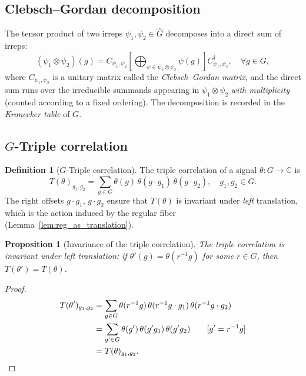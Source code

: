 \documentclass{article}
\newtheorem{proposition}[theorem]{Proposition}
\theoremstyle{definition}
\newtheorem{definition}[theorem]{Definition}
\theoremstyle{remark}
\newcommand{\C}{\mathbb{C}}
\newcommand{\Ghat}{\widehat{G}}
\begin{document}
\subsection{Clebsch--Gordan decomposition}\label{sec:cg}

The tensor product of two irreps $\psi_1, \psi_2 \in \Ghat$ decomposes into a direct sum of irreps:
\begin{equation}\label{eq:cg}
(\psi_1 \otimes \psi_2)(g) = C_{\psi_1,\psi_2} \left[\bigoplus_{\psi \in \psi_1 \otimes \psi_2} \psi(g)\right] C_{\psi_1,\psi_2}^\dagger, \quad \forall g \in G,
\end{equation}
where $C_{\psi_1,\psi_2}$ is a unitary matrix called the \textit{Clebsch--Gordan matrix}, and the direct sum runs over the irreducible summands appearing in $\psi_1 \otimes \psi_2$ \textit{with multiplicity} (counted according to a fixed ordering). The decomposition is recorded in the \textit{Kronecker table} of $G$.

\subsection{$G$-Triple correlation}\label{sec:tc_prelim}

\begin{definition}[$G$-Triple correlation]\label{def:tc}
The triple correlation of a signal $\theta : G \to \C$ is
\begin{equation}\label{eq:tc}
T(\theta)_{g_1, g_2} = \sum_{g \in G} \theta(g)\, \theta(g \cdot g_1)\, \theta(g \cdot g_2), \quad g_1, g_2 \in G.
\end{equation}
The right offsets $g \cdot g_1$, $g \cdot g_2$ ensure that $T(\theta)$ is invariant under \textit{left} translation, which is the action induced by the regular fiber (Lemma~\ref{lem:reg_as_translation}).
\end{definition}

\begin{proposition}[Invariance of the triple correlation]\label{prop:tc_inv}
The triple correlation is invariant under left translation: if $\theta'(g) = \theta(r^{-1}g)$ for some $r \in G$, then $T(\theta') = T(\theta)$.
\end{proposition}
\begin{proof}
\begin{align*}
T(\theta')_{g_1, g_2}
&= \sum_{g \in G} \theta(r^{-1}g)\, \theta(r^{-1}g \cdot g_1)\, \theta(r^{-1}g \cdot g_2) \\
&= \sum_{g' \in G} \theta(g')\, \theta(g' g_1)\, \theta(g' g_2) \qquad [g' = r^{-1}g] \\
&= T(\theta)_{g_1, g_2}. \qedhere
\end{align*}
\end{proof}
\end{document}
